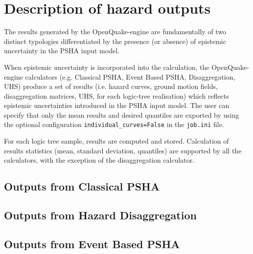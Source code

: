 \section{Description of hazard outputs}
\label{sec:hazard_outputs}

The results generated by the OpenQuake-engine are fundamentally of two
distinct typologies differentiated by the presence (or absence) of epistemic
uncertainty in the PSHA input model.

When epistemic uncertainty is incorporated into the calculation, the
OpenQuake-engine calculators (e.g. Classical PSHA, Event Based PSHA,
Disaggregation, UHS) produce a set of results (i.e. hazard curves, ground
motion fields, disaggregation matrices, UHS, for each logic-tree realisation)
which reflects epistemic uncertainties introduced in the PSHA input model. The user can specify that only the mean results and desired quantiles are exported by using the optional configuration \verb+individual_curves=False+ in the \verb=job.ini= file.

For each logic tree sample, results are computed and stored. Calculation of
results statistics (mean, standard deviation, quantiles) are supported by all
the calculators, with the exception of the disaggregation calculator.

\subsection{Outputs from Classical PSHA}
\label{subsec:output_classical_psha}


\subsection{Outputs from Hazard Disaggregation}
\label{subsec:output_hazard_disaggregation}


\subsection{Outputs from Event Based PSHA}
\label{subsec:output_event_based_psha}

